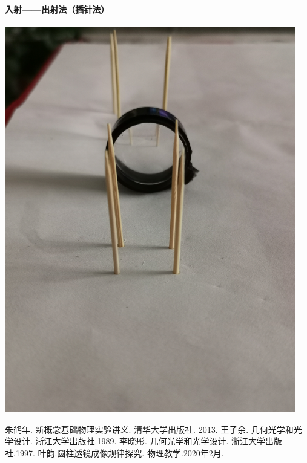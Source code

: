 \documentclass[UTF8]{ctexart}
\begin{document}
\paragraph{入射——出射法（插针法）}
\begin{center} 
\includegraphics[width=0.95\textwidth]{C.jpg} 
\end{center}
\begin{thebibliography}{123456} 
 朱鹤年. 新概念基础物理实验讲义. 清华大学出版社. 2013. 
 王子余. 几何光学和光学设计. 浙江大学出版社.1989. 
 李晓彤. 几何光学和光学设计. 浙江大学出版社.1997. 
 叶韵.圆柱透镜成像规律探究. 物理教学.2020年2月.
\end{thebibliography}
\end{document}
